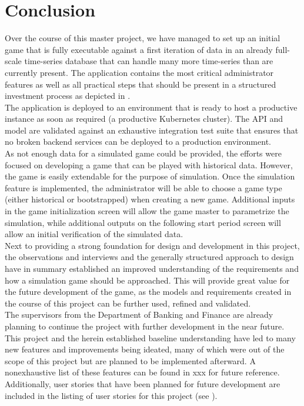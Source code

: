 \section{Conclusion}
Over the course of this master project, we have managed to set up an initial game that is fully executable against a first iteration of data in an already full-scale time-series database that can handle many more time-series than are currently present. The application contains the most critical administrator features as well as all practical steps that should be present in a structured investment process as depicted in . \\

The application is deployed to an environment that is ready to host a productive instance as soon as required (a productive Kubernetes cluster). The API and model are validated against an exhaustive integration test suite that ensures that no broken backend services can be deployed to a production environment. \\

As not enough data for a simulated game could be provided, the efforts were focused on developing a game that can be played with historical data. However, the game is easily extendable for the purpose of simulation. Once the simulation feature is implemented, the administrator will be able to choose a game type (either historical or bootstrapped) when creating a new game. Additional inputs in the game initialization screen will allow the game master to parametrize the simulation, while additional outputs on the following start period screen will allow an initial verification of the simulated data. \\

Next to providing a strong foundation for design and development in this project, the observations and interviews and the generally structured approach to design have in summary established an improved understanding of the requirements and how a simulation game should be approached. This will provide great value for the future development of the game, as the models and requirements created in the course of this project can be further used, refined and validated. \\

The supervisors from the Department of Banking and Finance are already planning to continue the project with further development in the near future. This project and the herein established baseline understanding have led to many new features and improvements being ideated, many of which were out of the scope of this project but are planned to be implemented afterward. A nonexhaustive list of these features can be found in xxx for future reference. Additionally, user stories that have been planned for future development are included in the listing of user stories for this project (see ). \\


